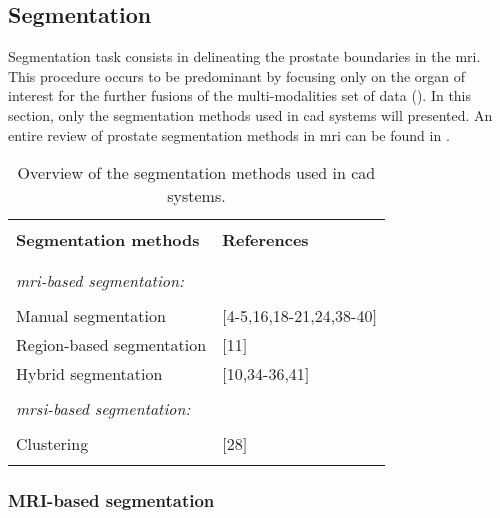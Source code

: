 \subsection{Segmentation} \label{subsec:segmentation}

Segmentation task consists in delineating the prostate boundaries in the \ac{mri}. This procedure occurs to be predominant by focusing only on the organ of interest for the further fusions of the multi-modalities set of data (\cite{Ghose2012}). In this section, only the segmentation methods used in \ac{cad} systems will presented. An entire review of prostate segmentation methods in \ac{mri} can be found in \cite{Ghose2012}.

\begin{table}
	\caption{Overview of the segmentation methods used in \ac{cad} systems.}
	\small
	\begin{tabular}{p{.65\linewidth} p{.25\linewidth}}
		\hline \\ [-1.5ex]
		\textbf{Segmentation methods} & \textbf{References} \\ \\ [-1.5ex]
		\hline \\ [-1.5ex]
		\textit{\ac{mri}-based segmentation:} & \\ \\ [-1.5ex]
		\quad Manual segmentation & $[$4-5,16,18-21,24,38-40$]$ \\
		\quad Region-based segmentation & $[$11$]$ \\
		\quad Hybrid segmentation & $[$10,34-36,41$]$ \\ \\ [-1.5ex]
		\textit{\ac{mrsi}-based segmentation:} & \\ \\ [-1.5ex]
		\quad Clustering & $[$28$]$ \\ \\ [-1.5ex]
		\hline
	\end{tabular}
\end{table}

\subsubsection{MRI-based segmentation}

